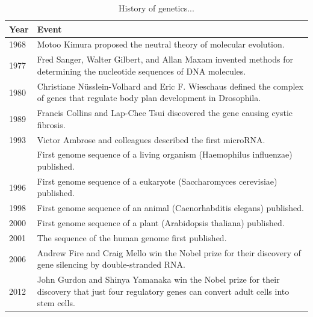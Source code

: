 \documentclass[11pt,ignorenonframetext,aspectratio=169]{beamer}
\begin{document}
\begin{frame}{}
\protect\hypertarget{section-14}{}
\begin{table}

\caption{\label{tab:history-table3}History of genetics...}
\centering
\fontsize{8}{10}\selectfont
\begin{tabular}[t]{l>{\raggedright\arraybackslash}p{40em}}
\toprule
Year & Event\\
\midrule
\rowcolor{gray!6}  1968 & Motoo Kimura proposed the neutral theory of molecular evolution.\\
1977 & Fred Sanger, Walter Gilbert, and Allan Maxam invented methods for determining the nucleotide sequences of DNA molecules.\\
\rowcolor{gray!6}  1980 & Christiane Nüsslein-Volhard and Eric F. Wieschaus defined the complex of genes that regulate body plan development in Drosophila.\\
1989 & Francis Collins and Lap-Chee Tsui discovered the gene causing cystic fibrosis.\\
\rowcolor{gray!6}  1993 & Victor Ambrose and colleagues described the first microRNA.\\
\addlinespace
1995 & First genome sequence of a living organism (Haemophilus influenzae) published.\\
\rowcolor{gray!6}  1996 & First genome sequence of a eukaryote (Saccharomyces cerevisiae) published.\\
1998 & First genome sequence of an animal (Caenorhabditis elegans) published.\\
\rowcolor{gray!6}  2000 & First genome sequence of a plant (Arabidopsis thaliana) published.\\
2001 & The sequence of the human genome first published.\\
\addlinespace
\rowcolor{gray!6}  2006 & Andrew Fire and Craig Mello win the Nobel prize for their discovery of gene silencing by double-stranded RNA.\\
2012 & John Gurdon and Shinya Yamanaka win the Nobel prize for their discovery that just four regulatory genes can convert adult cells into stem cells.\\
\bottomrule
\end{tabular}
\end{table}
\end{frame}
\end{document}
